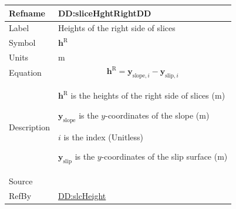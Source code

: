\documentclass[12pt]{article}
\begin{document}
\medskip
\noindent
\begin{minipage}{\textwidth}
\begin{tabular}{>{\raggedright}p{}>{\raggedright\arraybackslash}p{}}
\toprule \textbf{Refname} & \textbf{DD:sliceHghtRightDD}
\label{DD:sliceHghtRightDD}
\\ \midrule
Label & Heights of the right side of slices
        
\\ \midrule
Symbol & ${\symbf{h}^{\text{R}}}$
         
\\ \midrule
Units & ${\text{m}}$
        
\\ \midrule
Equation & \begin{displaymath}
           {\symbf{h}^{\text{R}}}={\symbf{y}_{\text{slope},i}}-{\symbf{y}_{\text{slip},i}}
           \end{displaymath}
\\ \midrule
Description & \begin{symbDescription}
              \item{${\symbf{h}^{\text{R}}}$ is the heights of the right side of slices (${\text{m}}$)}
              \item{${\symbf{y}_{\text{slope}}}$ is the $y$-coordinates of the slope (${\text{m}}$)}
              \item{$i$ is the index (Unitless)}
              \item{${\symbf{y}_{\text{slip}}}$ is the $y$-coordinates of the slip surface (${\text{m}}$)}
              \end{symbDescription}
\\ \midrule
Source & \cite{fredlund1977}
         
\\ \midrule
RefBy & \hyperref[DD:slcHeight]{DD:slcHeight}
        
\\ \bottomrule
\end{tabular}
\end{minipage}
\end{document}
